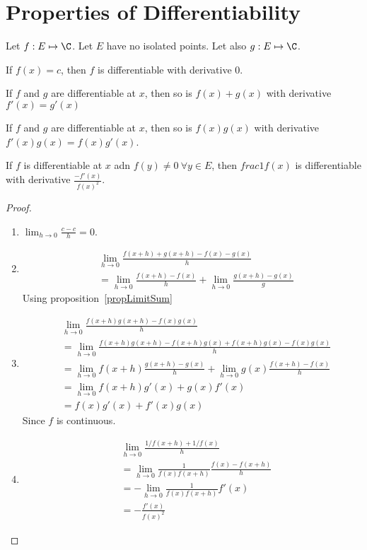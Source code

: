 \documentclass[../Main.tex]{subfiles}
\begin{document}
\section{Properties of Differentiability}
\begin{propositions}{
        Let $f : E \mapsto \C$. Let $E$ have no isolated points. Let also $g : E \mapsto \C$.
        \label{propsDiffProperties}
    }
    \item If $f(x) = c$, then $f$ is differentiable with derivative 0. \label{propConstantDiffability}    
    \item If $f$ and $g$ are differentiable at $x$, then so is $f(x) + g(x)$ with derivative $f'(x) = g'(x)$ \label{propSumDiffability}
    \item If $f$ and $g$ are differentiable at $x$, then so is $f(x)g(x)$ with derivative $f'(x) g(x) = f(x) g'(x)$. \label{propProdDiffability}
    \item If $f$ is differentiable at $x$ adn $f(y) \neq 0~\forall y \in E$, then $frac{1}{f(x)}$ is differentiable with derivative $\frac{-f'(x)}{f(x)^2}$. \label{propReciprocalDiffability}
\end{propositions}
\begin{proof}
    \begin{enumerate}
        \item $\lim_{h \to 0} \frac{c - c}{h} = 0$.
        \item
            \begin{align*}
                &\lim_{h \to 0} \frac{f(x + h) + g(x + h) - f(x) - g(x)}{h} \\
                &= \lim_{h \to 0} \frac{f(x + h) - f(x)}{h} + \lim_{h \to 0} \frac{g(x + h) - g(x)}{g}
            \end{align*}
            Using proposition~\ref{propLimitSum}
        \item 
            \begin{align*}
                &\lim_{h \to 0} \frac{f(x + h)g(x + h) - f(x) g(x)}{h} \\
                &= \lim_{h \to 0} \frac{f(x + h) g(x + h) - f(x + h) g(x) + f(x + h) g(x) - f(x) g(x)}{h} \\
                &= \lim_{h \to 0} f(x + h) \frac{g(x + h) - g(x)}{h} + \lim_{h \to 0} g(x) \frac{f(x + h) - f(x)}{h} \\
                &= \lim_{h \to 0} f(x + h) g'(x) + g(x) f'(x) \\
                &= f(x) g'(x) + f'(x) g(x)
            \end{align*}
            Since $f$ is continuous.
        \item 
            \begin{align*}
                &\lim_{h \to 0} \frac{1/f(x + h) + 1/f(x)}{h} \\
                &= \lim_{h \to 0} \frac{1}{f(x) f(x + h)} \frac{f(x) - f(x + h)}{h} \\
                &= -\lim_{h \to 0} \frac{1}{f(x) f(x + h)} f'(x) \\
                &= -\frac{f'(x)}{f(x)^2}
            \end{align*}
    \end{enumerate}
\end{proof}
\end{document}

